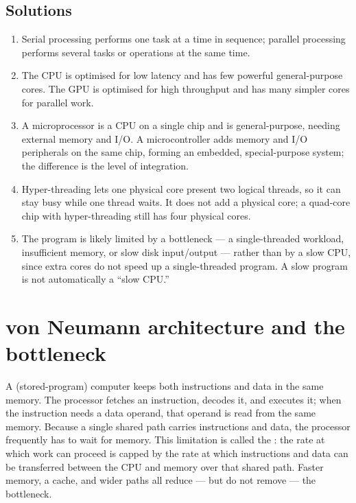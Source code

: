 \subsection*{Solutions}
\begingroup\small
\begin{enumerate}[label=\arabic*.]
  \item Serial processing performs one task at a time in sequence; parallel
    processing performs several tasks or operations at the same time.
  \item The CPU is optimised for low latency and has few powerful
    general-purpose cores. The GPU is optimised for high throughput and has
    many simpler cores for parallel work.
  \item A microprocessor is a CPU on a single chip and is general-purpose,
    needing external memory and I/O. A microcontroller adds memory and I/O
    peripherals on the same chip, forming an embedded, special-purpose system;
    the difference is the level of integration.
  \item Hyper-threading lets one physical core present two logical threads, so
    it can stay busy while one thread waits. It does not add a physical core;
    a quad-core chip with hyper-threading still has four physical cores.
  \item The program is likely limited by a bottleneck --- a single-threaded
    workload, insufficient memory, or slow disk input/output --- rather than
    by a slow CPU, since extra cores do not speed up a single-threaded
    program. A slow program is not automatically a ``slow CPU.''
\end{enumerate}
\endgroup

\section{von Neumann architecture and the bottleneck}
A  (stored-program) computer keeps both instructions and
data in the same memory. The processor fetches an instruction, decodes it,
and executes it; when the instruction needs a data operand, that operand is
read from the same memory. Because a single shared path carries instructions
and data, the processor frequently has to wait for memory. This limitation is
called the : the rate at which work can proceed is
capped by the rate at which instructions and data can be transferred between
the CPU and memory over that shared path. Faster memory, a cache, and wider
paths all reduce --- but do not remove --- the bottleneck.


